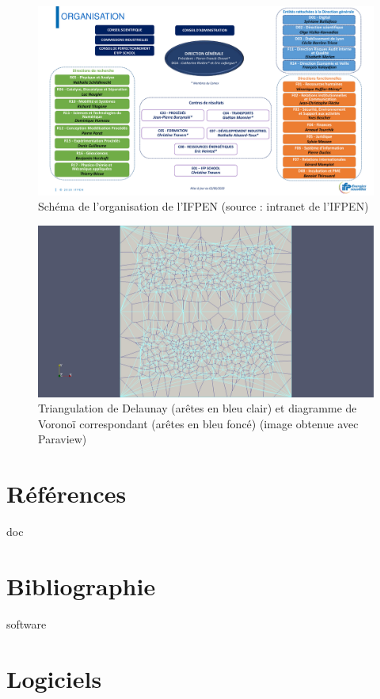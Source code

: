 \documentclass[12pt,a4paper]{report}
\begin{document}
\begin{center}
\begin{figure}[htbp]
\includegraphics[scale=0.6, angle=90]{vf-schema-organisation-ifpen-marguerite.pdf}
\caption{Schéma de l'organisation de l'IFPEN (source : intranet de l'IFPEN)}
\label{ifpen_org}
\end{figure}
\end{center}
\clearpage

\begin{center}
\begin{figure}[htbp]
\includegraphics[scale=0.35, viewport=530 0 1680 1129, clip]{del_vor.jpg}
\caption{Triangulation de Delaunay (arêtes en bleu clair) et diagramme de Voronoï correspondant (arêtes en bleu foncé) (image obtenue avec Paraview)}
\label{del_vor}
\end{figure}
\end{center}
\clearpage


\section{Références}
\vspace*{1cm}


\begin{btSect}{doc}
\section*{Bibliographie}
\btPrintCited
\end{btSect}
\label{biblio}


\begin{btSect}{software}
\section*{Logiciels}
\btPrintCited
\end{btSect}
\label{software}
\end{document}
